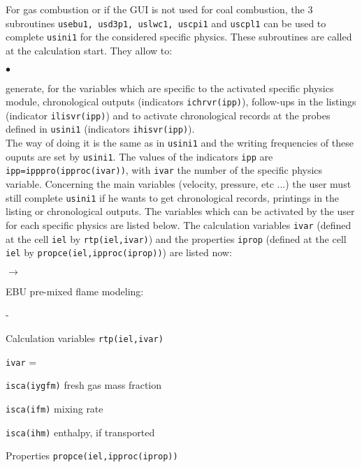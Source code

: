 {{{For gas combustion or if the GUI is not used for coal combustion, the 3 subroutines \texttt{usebu1, usd3p1, uslwc1, uscpi1} and \texttt{uscpl1} can be used to complete \texttt{usini1} for the
considered specific physics. These subroutines are called at the calculation start.
They allow to:
\begin{list}{$\bullet$}{}
\item generate, for the variables which are specific to the activated
             specific physics module, chronological outputs (indicators
             \texttt{ichrvr(ipp)}), follow-ups in the listings
             (indicator \texttt{ilisvr(ipp)}) and to activate
             chronological records at the probes defined in
             \texttt{usini1} (indicators \texttt{ihisvr(ipp)}).\\
The way of doing it is the same as in \texttt{usini1} and the writing
      frequencies of these ouputs are set by \texttt{usini1}. The values
      of the indicators \texttt{ipp} are
      \texttt{ipp=ipppro(ipproc(ivar))}, with \texttt{ivar}
      the number of the specific physics variable.
Concerning the main variables (velocity, pressure, etc ...) the user
      must still complete \texttt{usini1} if he wants to get
      chronological records, printings in the listing or chronological
      outputs.
The variables which can be activated by the user for each specific
      physics are listed below. The calculation variables \texttt{ivar} (defined
      at the cell \texttt{iel} by \texttt{rtp(iel,ivar)}) and the properties
      \texttt{iprop} (defined at the cell \texttt{iel} by
      \texttt{propce(iel,ipproc(iprop))}) are listed now:
      \begin{list}{$\rightarrow$}{}
       \item EBU pre-mixed flame modeling:
       \begin{list}{-}{}
        \item Calculation variables \texttt{rtp(iel,ivar)}
              \begin{list}{\texttt{ivar} = }{}
               \item \texttt{isca(iygfm)} fresh gas mass fraction
               \item \texttt{isca(ifm)} mixing rate
               \item \texttt{isca(ihm)} enthalpy, if transported
              \end{list}
        \item Properties \texttt{propce(iel,ipproc(iprop))}

\end{list}
\end{list}
\end{list}}}}
